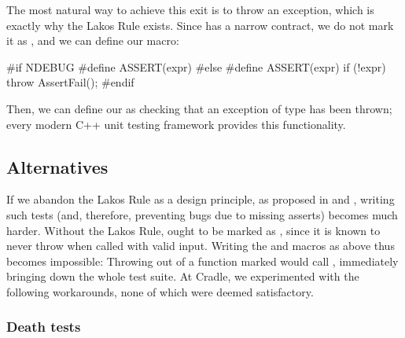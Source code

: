 The most natural way to achieve this exit is to throw an exception, which is exactly why the Lakos Rule exists. Since  has a narrow contract, we do not mark it as , and we can define our  macro:
\begin{codeblock}
#if NDEBUG
  #define ASSERT(expr)
#else
  #define ASSERT(expr) if (!expr) throw AssertFail();
#endif
\end{codeblock}
Then, we can define our  as checking that an exception of type  has been thrown; every modern C++ unit testing framework provides this functionality.

\subsection{Alternatives}

If we abandon the Lakos Rule as a design principle, as proposed in \cite{P1656R2} and \cite{P2148R0}, writing such tests (and, therefore, preventing bugs due to missing asserts) becomes much harder. Without the Lakos Rule,  ought to be marked as , since it %
is known to never throw when called with valid input. Writing the  and  macros as above thus becomes impossible: Throwing  out of a function marked  would call , immediately bringing down the whole test suite. At Cradle, we experimented with the following workarounds, none of which were deemed satisfactory.

\subsubsection{Death tests}

